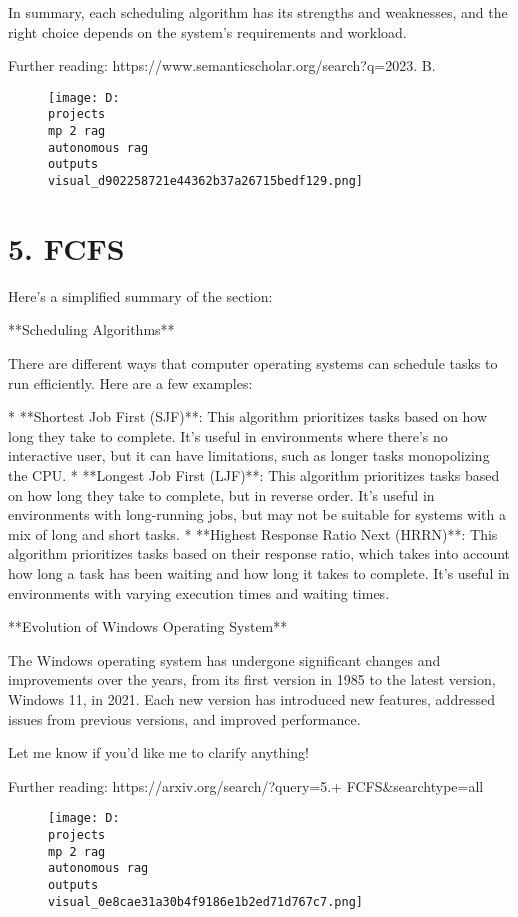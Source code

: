 \documentclass[12pt,a4paper]{article}
\begin{document}
In summary, each scheduling algorithm has its strengths and weaknesses, and the right choice depends on the system's requirements and workload.

Further reading: https://www.semanticscholar.org/search?q=2023.%
B.%
\begin{figure}[h]
\centering
\texttt{[image: D:\\projects\\mp 2 rag\\autonomous rag\\outputs\\visual\_d902258721e44362b37a26715bedf129.png]}
\end{figure}
\section{5. 
FCFS}
Here's a simplified summary of the section:

**Scheduling Algorithms**

There are different ways that computer operating systems can schedule tasks to run efficiently. Here are a few examples:

* **Shortest Job First (SJF)**: This algorithm prioritizes tasks based on how long they take to complete. It's useful in environments where there's no interactive user, but it can have limitations, such as longer tasks monopolizing the CPU.
* **Longest Job First (LJF)**: This algorithm prioritizes tasks based on how long they take to complete, but in reverse order. It's useful in environments with long-running jobs, but may not be suitable for systems with a mix of long and short tasks.
* **Highest Response Ratio Next (HRRN)**: This algorithm prioritizes tasks based on their response ratio, which takes into account how long a task has been waiting and how long it takes to complete. It's useful in environments with varying execution times and waiting times.

**Evolution of Windows Operating System**

The Windows operating system has undergone significant changes and improvements over the years, from its first version in 1985 to the latest version, Windows 11, in 2021. Each new version has introduced new features, addressed issues from previous versions, and improved performance.

Let me know if you'd like me to clarify anything!

Further reading: https://arxiv.org/search/?query=5.+
FCFS&searchtype=all
\begin{figure}[h]
\centering
\texttt{[image: D:\\projects\\mp 2 rag\\autonomous rag\\outputs\\visual\_0e8cae31a30b4f9186e1b2ed71d767c7.png]}
\end{figure}
\end{document}
